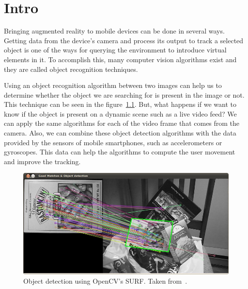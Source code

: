 \chapter{Intro}

Bringing augmented reality to mobile devices can be done in several ways. Getting
data from the device's camera and process its output to track a selected object is
one of the ways for querying the environment to introduce virtual elements in it. To
accomplish this, many computer vision algorithms exist and they are called object
recognition techniques.  

Using an object recognition algorithm between two images can help us to
determine whether the object we are searching for is present in the image or
not. This technique can be seen in the figure~\ref{fig:introdetect}. But, what happens if
we want to know if the object is present on a dynamic scene such as a
live video feed? We can apply the same algorithms for each of the video frame
that comes from the camera. 
Also, we can combine these object detection algorithms with the data provided
by the sensors of mobile smartphones, such as accelerometers or
gyroscopes. This data can help the algorithms to compute the user movement and
improve the tracking.

\begin{figure}
\centering
\includegraphics[scale=0.45]{img/intro-feature.jpg}
\caption{\label{fig:introdetect} Object detection using OpenCV's SURF. Taken
  from~\cite{opencvhomography}.} 
\end{figure} 

